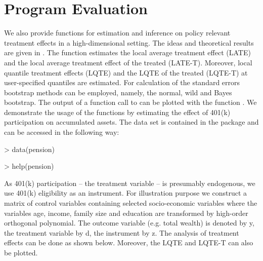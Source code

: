 \documentclass{amsart}
\begin{document}
\section{Program Evaluation}
We also provide functions for estimation and inference on policy relevant treatment effects in a high-dimensional setting. The ideas and theoretical results are given in \cite{BCFH:Policy}. The function  estimates the local average treatment effect (LATE) and the local average treatment effect of the treated (LATE-T). Moreover, local quantile treatment effects (LQTE) and the LQTE of the treated (LQTE-T) at user-specified quantiles are estimated. For calculation of the standard errors bootstrap methods can be employed, namely, the normal, wild and Bayes bootstrap. The output of a function call to  can be plotted with the function .
We demonstrate the usage of the functions by estimating the effect of 401(k) participation on accumulated assets. The data set is contained in the package and can be accessed in the following way:
\begin{Schunk}
\begin{Sinput}
> data(pension)
\end{Sinput}
\end{Schunk}

\begin{Schunk}
\begin{Sinput}
> help(pension)
\end{Sinput}
\end{Schunk}

As 401(k) participation -- the treatment variable -- is presumably endogenous, we use 401(k) eligibility as an instrument. For illustration purpose we construct a matrix of control variables containing selected socio-economic variables where the variables age, income, family size and education are transformed by high-order orthogonal polynomial. The outcome variable (e.g. total wealth) is denoted by y, the treatment variable by d, the instrument by z. The analysis of treatment effects can be done as shown below. Moreover, the LQTE and LQTE-T can also be plotted.
\end{document}
